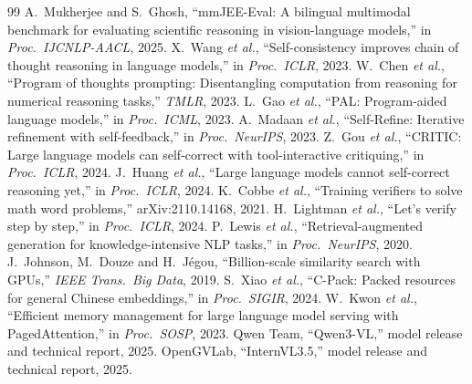 \documentclass[conference]{IEEEtran}
\begin{document}
\begin{thebibliography}{99}\footnotesize
{} A.~Mukherjee and S.~Ghosh, ``mmJEE-Eval: A bilingual multimodal benchmark for
evaluating scientific reasoning in vision-language models,'' in \emph{Proc.\ IJCNLP-AACL}, 2025.
 X.~Wang \emph{et al.}, ``Self-consistency improves chain of thought
reasoning in language models,'' in \emph{Proc.\ ICLR}, 2023.
 W.~Chen \emph{et al.}, ``Program of thoughts prompting: Disentangling computation
from reasoning for numerical reasoning tasks,'' \emph{TMLR}, 2023.
 L.~Gao \emph{et al.}, ``PAL: Program-aided language models,'' in \emph{Proc.\
ICML}, 2023.
 A.~Madaan \emph{et al.}, ``Self-Refine: Iterative refinement with
self-feedback,'' in \emph{Proc.\ NeurIPS}, 2023.
 Z.~Gou \emph{et al.}, ``CRITIC: Large language models can self-correct with
tool-interactive critiquing,'' in \emph{Proc.\ ICLR}, 2024.
 J.~Huang \emph{et al.}, ``Large language models cannot self-correct
reasoning yet,'' in \emph{Proc.\ ICLR}, 2024.
 K.~Cobbe \emph{et al.}, ``Training verifiers to solve math word problems,''
arXiv:2110.14168, 2021.
 H.~Lightman \emph{et al.}, ``Let's verify step by step,'' in \emph{Proc.\
ICLR}, 2024.
\bibitem{rag} P.~Lewis \emph{et al.}, ``Retrieval-augmented generation for knowledge-intensive
NLP tasks,'' in \emph{Proc.\ NeurIPS}, 2020.
\bibitem{faiss} J.~Johnson, M.~Douze and H.~J\'egou, ``Billion-scale similarity search with
GPUs,'' \emph{IEEE Trans.\ Big Data}, 2019.
\bibitem{bge} S.~Xiao \emph{et al.}, ``C-Pack: Packed resources for general Chinese
embeddings,'' in \emph{Proc.\ SIGIR}, 2024.
\bibitem{vllm} W.~Kwon \emph{et al.}, ``Efficient memory management for large language model
serving with PagedAttention,'' in \emph{Proc.\ SOSP}, 2023.
\bibitem{qwen3vl} Qwen Team, ``Qwen3-VL,'' model release and technical report, 2025.
\bibitem{internvl35} OpenGVLab, ``InternVL3.5,'' model release and technical report, 2025.
\end{thebibliography}
\end{document}
